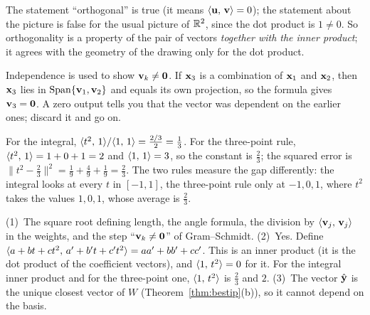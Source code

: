 \documentclass[11pt]{article}
\begin{document}
\begin{description}[leftmargin=0pt,itemsep=5pt]
  \item[Pause and think \ref{think:orthwho}.] The statement ``orthogonal'' is true (it means $\langle \mathbf{u},\,\mathbf{v}\rangle=0$); the statement about the picture is false for the usual picture of $\mathbb{R}^2$, since the dot product is $1\neq0$. So orthogonality is a property of the pair of vectors \emph{together with the inner product}; it agrees with the geometry of the drawing only for the dot product.
  \item[Pause and think \ref{think:gsdep}.] Independence is used to show $\mathbf{v}_k\neq\mathbf{0}$. If $\mathbf{x}_3$ is a combination of $\mathbf{x}_1$ and $\mathbf{x}_2$, then $\mathbf{x}_3$ lies in $\operatorname{Span}\{\mathbf{v}_1,\mathbf{v}_2\}$ and equals its own projection, so the formula gives $\mathbf{v}_3=\mathbf{0}$. A zero output tells you that the vector was dependent on the earlier ones; discard it and go on.
  \item[Pause and think \ref{think:bestwho}.] For the integral, $\langle t^2,\,1\rangle/\langle 1,\,1\rangle=\tfrac{2/3}{2}=\tfrac13$. For the three-point rule, $\langle t^2,\,1\rangle=1+0+1=2$ and $\langle 1,\,1\rangle=3$, so the constant is $\tfrac23$; the squared error is $\lVert t^2-\tfrac23\rVert^2=\tfrac19+\tfrac49+\tfrac19=\tfrac23$. The two rules measure the gap differently: the integral looks at every $t$ in $[-1,1]$, the three-point rule only at $-1,0,1$, where $t^2$ takes the values $1,0,1$, whose average is $\tfrac23$.
  \item[Questions to think about.] (1)~The square root defining length, the angle formula, the division by $\langle \mathbf{v}_j,\,\mathbf{v}_j\rangle$ in the weights, and the step ``$\mathbf{v}_k\neq\mathbf{0}$'' of Gram--Schmidt. (2)~Yes. Define $\langle a+bt+ct^2,\,a'+b't+c't^2\rangle=aa'+bb'+cc'$. This is an inner product (it is the dot product of the coefficient vectors), and $\langle 1,\,t^2\rangle=0$ for it. For the integral inner product and for the three-point one, $\langle 1,\,t^2\rangle$ is $\tfrac23$ and $2$. (3)~The vector $\hat{\mathbf{y}}$ is the unique closest vector of $W$ (Theorem~\ref{thm:bestip}(b)), so it cannot depend on the basis.
\end{description}
\end{document}
